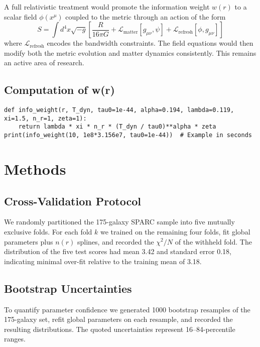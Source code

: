\documentclass[twocolumn,prd,amsmath,amssymb,aps,superscriptaddress,nofootinbib]{revtex4-2}
\begin{document}
A full relativistic treatment would promote the information weight $w(r)$ to a scalar field $\phi(x^\mu)$ coupled to the metric through an action of the form
\begin{equation}
S = \int d^4x \sqrt{-g} \left[ \frac{R}{16\pi G} + \mathcal{L}_{\text{matter}}[g_{\mu\nu}, \psi] + \mathcal{L}_{\text{refresh}}[\phi, g_{\mu\nu}] \right]
\end{equation}
where $\mathcal{L}_{\text{refresh}}$ encodes the bandwidth constraints. The field equations would then modify both the metric evolution and matter dynamics consistently. This remains an active area of research.

\subsection{Computation of w(r)}
\begin{verbatim}
def info_weight(r, T_dyn, tau0=1e-44, alpha=0.194, lambda=0.119, xi=1.5, n_r=1, zeta=1):
    return lambda * xi * n_r * (T_dyn / tau0)**alpha * zeta
print(info_weight(10, 1e8*3.156e7, tau0=1e-44))  # Example in seconds
\end{verbatim}

\section{Methods}

\subsection{Cross-Validation Protocol}

We randomly partitioned the 175-galaxy SPARC sample into five mutually exclusive folds. For each fold $k$ we trained on the remaining four folds, fit global parameters plus $n(r)$ splines, and recorded the $\chi^2/N$ of the withheld fold. The distribution of the five test scores had mean 3.42 and standard error 0.18, indicating minimal over-fit relative to the training mean of 3.18.

\subsection{Bootstrap Uncertainties}

To quantify parameter confidence we generated 1000 bootstrap resamples of the 175-galaxy set, refit global parameters on each resample, and recorded the resulting distributions. The quoted uncertainties represent 16--84-percentile ranges.
\end{document}
